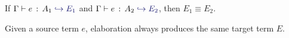 \begin{theorem} \label{unique-elaboration}

  If $\hastype \Gamma e {A_1} \yields {E_1}$ and $\hastype \Gamma e {A_2}
  \yields {E_2}$, then $E_1 \equiv E_2$.

\end{theorem}

Given a source term $e$, elaboration always produces the same target term $E$.

%
%
%
%
